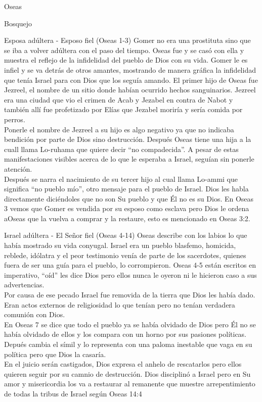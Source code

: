 \begin{section}{Oseas}
\begin{subsection}{Bosquejo}
\begin{subsubsection}{Esposa adúltera - Esposo fiel (Oseas 1-3)}
			Gomer no era una prostituta sino que se iba a volver adúltera con el paso del tiempo. Oseas fue y se casó con ella y muestra el reflejo de la infidelidad del pueblo de Dios con su vida. Gomer le es infiel y se va detrás de otros amantes, mostrando de manera gráfica la infidelidad que tenía Israel para con Dios que los seguía amando. El primer hijo de Oseas fue Jezreel, el nombre de un sitio donde habían ocurrido hechos sanguinarios. Jezreel era una ciudad que vio el crimen de Acab y Jezabel en contra de Nabot y también allí fue profetizado por Elías que Jezabel moriría y sería comida por perros.\\
			Ponerle el nombre de Jezreel a su hijo es algo negativo ya que no indicaba bendición por parte de Dios sino destrucción. Después Oseas tiene una hija a la cuall llama Lo-ruhama que quiere decir ``no compadecida''. A pesar de estas manifestaciones visibles acerca de lo que le esperaba a Israel, seguían sin ponerle atención. \\
			Después se narra el nacimiento de su tercer hijo al cual llama Lo-ammi que significa ``no pueblo mío'', otro mensaje para el pueblo de Israel. Dios les habla directamente diciéndoles que no son Su pueblo y que Él no es su Dios. En Oseas 3 vemos que Gomer es vendida por su esposo como esclava pero Dios le ordena aOseas que la vuelva a comprar y la restaure, esto es mencionado en Oseas 3:2.
		\end{subsubsection}
		\begin{subsubsection}{Israel adúltera - El Señor fiel (Oseas 4-14)}
			Oseas describe con los labios lo que había mostrado su vida conyugal. Israel era un pueblo blasfemo, homicida, reblede, idólatra y el peor testimonio venía de parte de los sacerdotes, quienes fuera de ser una guía para el pueblo, lo corrompieron. Oseas 4-5 están escritos en imperativo, ``oíd'' les dice Dios pero ellos nunca le oyeron ni le hicieron caso a sus advertencias.\\
			Por causa de ese pecado Israel fue removida de la tierra que Dios les había dado. Eran actos externos de religiosidad lo que tenían pero no tenían verdadera comunión con Dios.\\
			En Oseas 7 se dice que todo el pueblo ya se había olvidado de Dios pero Él no se había olvidado de ellos y los compara con un horno por sus pasiones políticas. Depués cambia el símil y lo representa con una paloma inestable que vaga en su política pero que Dios la casaría. \\
			En el juicio serán castigados, Dios expresa el anhelo de rescatarlos pero ellos quieren seguir por su camnio de destrucción. Dios disciplinó a Israel pero en Su amor y misericordia los va a restaurar al remanente que muestre arrepentimiento de todas la tribus de Israel según Oseas 14:4 \\
		\end{subsubsection}
	\end{subsection}
\end{section}
%



